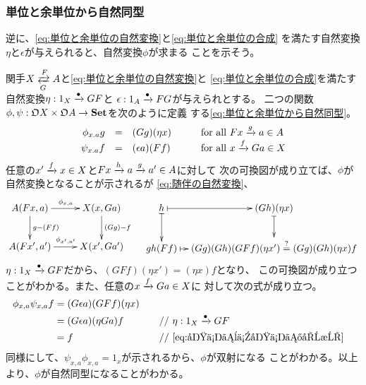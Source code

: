 {\subsubsection{単位と余単位から自然同型}
\label{s3:単位と余単位から自然同型} %
	逆に、\eqref{eq:単位と余単位の自然変換}と\eqref{eq:単位と余単位の合成}
	を満たす自然変換$\eta$と$\epsilon$が与えられると、自然変換$\phi$が求まる
	ことを示そう。

	関手$X\xtofrom{F}{G}A$と\eqref{eq:単位と余単位の自然変換}と
	\eqref{eq:単位と余単位の合成}を満たす自然変換$\eta:1_X\xrightarrow[{}]{\bullet}GF$と
	$\epsilon:1_A\xrightarrow[{}]{\bullet}FG$が与えられとする。
	二つの関数$\phi,\psi:{\mathfrak{O}} X\times{\mathfrak{O}} A\to{\mathbf{Set}}$を次のように定義
	する\eqref{eq:単位と余単位から自然同型}。
	\begin{equation*}\begin{array}{rclcl}
		\phi_{x.a}g &=& (Gg)(\eta x)
		&\quad&\text{for all } Fx\xrightarrow[{}]{g}a\in A \\
		\psi_{x.a}f &=& (\epsilon a)(Ff)
		&\quad&\text{for all } x\xrightarrow[{}]{f}Ga\in X \\
	\end{array}\end{equation*}
	任意の$x'\xrightarrow[{}]{f}x\in X$と$Fx\xrightarrow[{}]{h}a\xrightarrow[{}]{g}a'\in A$に対して
	次の可換図が成り立てば、$\phi$が自然変換となることが示されるが
	\eqref{eq:随伴の自然変換}、
	\begin{equation*}\begin{split}
		\xymatrix{
			A(Fx,a) \ar[r]^{\phi_{x,a}} \ar[d]^{g-(Ff)} 
			& X(x,Ga) \ar[d]^{(Gg)-f} \\
			A(Fx',a') \ar[r]^{\phi_{x',a'}} & X(x',Ga')
		}\quad\xymatrix@C=2ex{
			h \ar@{|->}[r] \ar@{|->}[d] & (Gh)(\eta x) \ar@{|->}[d] \\
			gh(Ff) \ar@{|->}[r] & (Gg)(Gh)(GFf)(\eta x') \overset{?}{=}
			(Gg)(Gh)(\eta x)f
		}
	\end{split}\end{equation*}
	$\eta:1_X\xrightarrow[{}]{\bullet}GF$だから、$(GFf)(\eta x')=(\eta x)f$となり、
	この可換図が成り立つことがわかる。また、任意の$x\xrightarrow[{}]{f}Ga\in X$に
	対して次の式が成り立つ。
	\begin{alignat*}{2}
		\phi_{x,a}\psi_{x,a}f &= (G\epsilon a)(GFf)(\eta x) \\
		&= (G\epsilon a)(\eta Ga)f &\quad&\text{// } \eta:1_X\xto{\bullet}GF \\
		&= f &\quad&\text{// }\eqref{eq:単位と余単位の合成} %
	\end{alignat*}
	同様にして、$\psi_{x,a}\phi_{x,a}=1_x$が示されるから、$\phi$が双射になる
	ことがわかる。以上より、$\phi$が自然同型になることがわかる。
}
